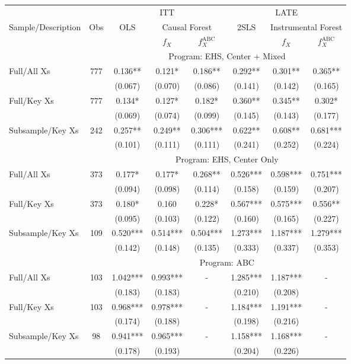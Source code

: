 \begin{tabular}{lccccccc}
\toprule 
\midrule 
\multicolumn{2}{c}{} & \multicolumn{3}{c}{ITT} & \multicolumn{3}{c}{LATE} \\
 \cmidrule(lr){3-5} \cmidrule(lr){6-8} 
Sample/Description & Obs & OLS & \multicolumn{2}{c}{Causal Forest} & 2SLS & \multicolumn{2}{c}{Instrumental Forest} \\
\multicolumn{3}{c}{} & $f_X$ & $f_X^{\text{ABC}}$ &  & $f_X$ & $f_X^{\text{ABC}}$ \\
\midrule 
 &  & \multicolumn{6}{c}{Program: EHS, Center $+$ Mixed} \\
 \cmidrule(lr){3-8} 
Full/All Xs & 777 & 0.136** & 0.121* & 0.186** & 0.292** & 0.301** & 0.365** \\
 &  & (0.067) & (0.070) & (0.086) & (0.141) & (0.142) & (0.165) \\
Full/Key Xs & 777 & 0.134* & 0.127* & 0.182* & 0.360** & 0.345** & 0.302* \\
 &  & (0.069) & (0.074) & (0.099) & (0.145) & (0.143) & (0.177) \\
Subsample/Key Xs & 242 & 0.257** & 0.249** & 0.306*** & 0.622** & 0.608** & 0.681*** \\
 &  & (0.101) & (0.111) & (0.111) & (0.241) & (0.252) & (0.224) \\
\midrule 
 &  & \multicolumn{6}{c}{Program: EHS, Center Only} \\
 \cmidrule(lr){3-8} 
Full/All Xs & 373 & 0.177* & 0.177* & 0.268** & 0.526*** & 0.598*** & 0.751*** \\
 &  & (0.094) & (0.098) & (0.114) & (0.158) & (0.159) & (0.207) \\
Full/Key Xs & 373 & 0.180* & 0.160 & 0.228* & 0.567*** & 0.575*** & 0.556** \\
 &  & (0.095) & (0.103) & (0.122) & (0.160) & (0.165) & (0.227) \\
Subsample/Key Xs & 109 & 0.520*** & 0.514*** & 0.504*** & 1.273*** & 1.187*** & 1.279*** \\
 &  & (0.142) & (0.148) & (0.135) & (0.333) & (0.337) & (0.353) \\
\midrule 
 &  & \multicolumn{6}{c}{Program: ABC} \\
 \cmidrule(lr){3-8} 
Full/All Xs & 103 & 1.042*** & 0.993*** & - & 1.285*** & 1.187*** & - \\
 &  & (0.183) & (0.183) &  & (0.210) & (0.208) &  \\
Full/Key Xs & 103 & 0.968*** & 0.978*** & - & 1.184*** & 1.191*** & - \\
 &  & (0.174) & (0.188) &  & (0.198) & (0.216) &  \\
Subsample/Key Xs & 98 & 0.941*** & 0.965*** & - & 1.158*** & 1.168*** & - \\
 &  & (0.178) & (0.193) &  & (0.204) & (0.226) &  \\
\midrule 
\bottomrule 
\end{tabular}
